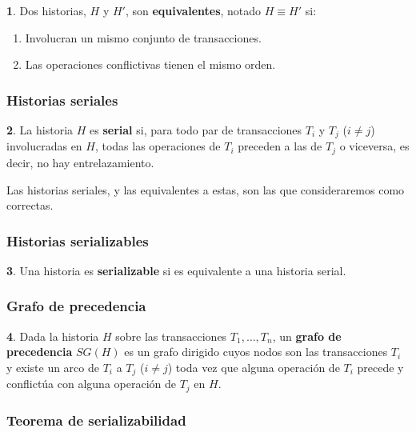 \documentclass[english]{article}
\theoremstyle{definition}
\theoremstyle{definition}
\newtheorem*{defn*}{\protect\definitionname}
\providecommand{\definitionname}{Definición}
\begin{document}
\begin{defn*}
Dos historias, $H$ y $H'$, son \textbf{equivalentes}, notado $H \equiv H'$ si:

\begin{enumerate}
    \item Involucran un mismo conjunto de transacciones.
    \item Las operaciones conflictivas tienen el mismo orden.
\end{enumerate}
\end{defn*}

\subsubsection{Historias seriales}

\begin{defn*}
La historia $H$ es \textbf{serial} si, para todo par de transacciones $T_i$ y
$T_j$ ($i \not= j$) involucradas en $H$, todas las operaciones de $T_i$
preceden a las de $T_j$ o viceversa, es decir, no hay entrelazamiento.
\end{defn*}

Las historias seriales, y las equivalentes a estas, son las que consideraremos
como correctas.

\subsubsection{Historias serializables}

\begin{defn*}
Una historia es \textbf{serializable} si es equivalente a una historia serial.
\end{defn*}

\subsubsection{Grafo de precedencia}

\begin{defn*}
Dada la historia $H$ sobre las transacciones $T_1, \dots, T_n$, un
\textbf{grafo de precedencia} $SG(H)$ es un grafo dirigido cuyos nodos son las
transacciones $T_i$ y existe un arco de $T_i$ a $T_j$ ($i \not= j$) toda vez
que alguna operación de $T_i$ precede y conflictúa con alguna operación de
$T_j$ en $H$.
\end{defn*}

\subsubsection{Teorema de serializabilidad}
\end{document}
